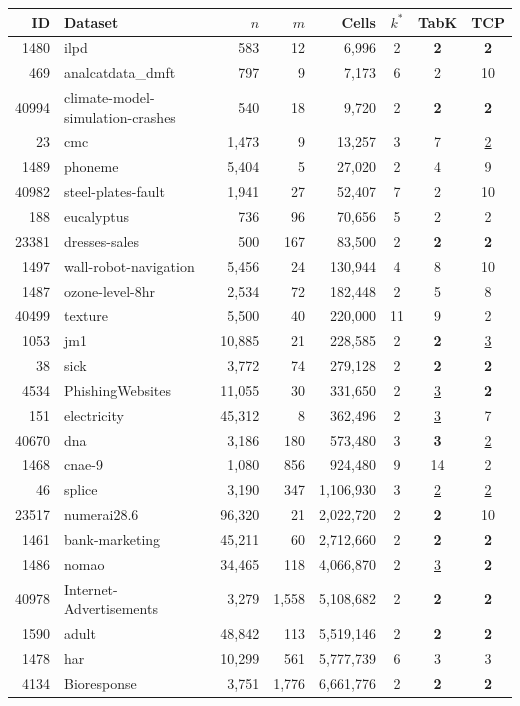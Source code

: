 \begin{tabular}{r l r r r c c c}
\toprule
ID & Dataset & $n$ & $m$ & Cells & $k^*$ & TabK & TCP \\
\midrule
1480 & ilpd & 583 & 12 & 6{,}996 & 2 & \textbf{2} & \textbf{2} \\
469 & analcatdata\_dmft & 797 & 9 & 7{,}173 & 6 & 2 & 10 \\
40994 & climate-model-simulation-crashes & 540 & 18 & 9{,}720 & 2 & \textbf{2} & \textbf{2} \\
23 & cmc & 1{,}473 & 9 & 13{,}257 & 3 & 7 & \underline{2} \\
1489 & phoneme & 5{,}404 & 5 & 27{,}020 & 2 & 4 & 9 \\
40982 & steel-plates-fault & 1{,}941 & 27 & 52{,}407 & 7 & 2 & 10 \\
188 & eucalyptus & 736 & 96 & 70{,}656 & 5 & 2 & 2 \\
23381 & dresses-sales & 500 & 167 & 83{,}500 & 2 & \textbf{2} & \textbf{2} \\
1497 & wall-robot-navigation & 5{,}456 & 24 & 130{,}944 & 4 & 8 & 10 \\
1487 & ozone-level-8hr & 2{,}534 & 72 & 182{,}448 & 2 & 5 & 8 \\
40499 & texture & 5{,}500 & 40 & 220{,}000 & 11 & 9 & 2 \\
1053 & jm1 & 10{,}885 & 21 & 228{,}585 & 2 & \textbf{2} & \underline{3} \\
38 & sick & 3{,}772 & 74 & 279{,}128 & 2 & \textbf{2} & \textbf{2} \\
4534 & PhishingWebsites & 11{,}055 & 30 & 331{,}650 & 2 & \underline{3} & \textbf{2} \\
151 & electricity & 45{,}312 & 8 & 362{,}496 & 2 & \underline{3} & 7 \\
\midrule
40670 & dna & 3{,}186 & 180 & 573{,}480 & 3 & \textbf{3} & \underline{2} \\
1468 & cnae-9 & 1{,}080 & 856 & 924{,}480 & 9 & 14 & 2 \\
46 & splice & 3{,}190 & 347 & 1{,}106{,}930 & 3 & \underline{2} & \underline{2} \\
23517 & numerai28.6 & 96{,}320 & 21 & 2{,}022{,}720 & 2 & \textbf{2} & 10 \\
1461 & bank-marketing & 45{,}211 & 60 & 2{,}712{,}660 & 2 & \textbf{2} & \textbf{2} \\
1486 & nomao & 34{,}465 & 118 & 4{,}066{,}870 & 2 & \underline{3} & \textbf{2} \\
40978 & Internet-Advertisements & 3{,}279 & 1{,}558 & 5{,}108{,}682 & 2 & \textbf{2} & \textbf{2} \\
1590 & adult & 48{,}842 & 113 & 5{,}519{,}146 & 2 & \textbf{2} & \textbf{2} \\
1478 & har & 10{,}299 & 561 & 5{,}777{,}739 & 6 & 3 & 3 \\
4134 & Bioresponse & 3{,}751 & 1{,}776 & 6{,}661{,}776 & 2 & \textbf{2} & \textbf{2} \\
\bottomrule
\end{tabular}
